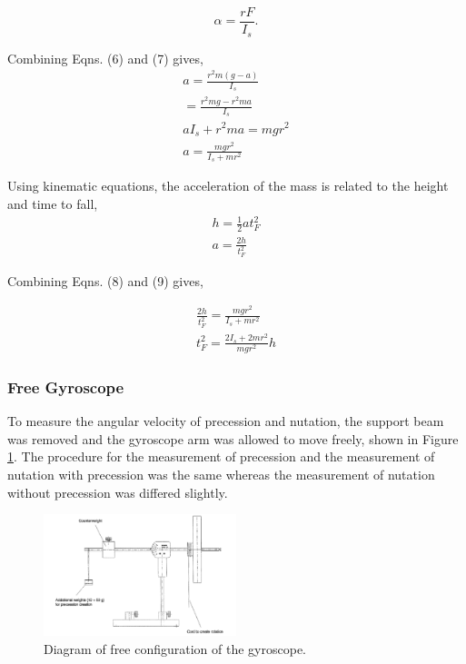 \documentclass{article}
\begin{document}
\begin{equation}
    \alpha = \frac{rF}{I_s}.
\end{equation}

Combining Eqns. (6) and (7) gives,
\begin{equation}
    \begin{split}
    a = \frac{r^2m(g-a)}{I_s} \\
    = \frac{r^2mg-r^2ma}{I_s} \\
    aI_s+r^2ma = mgr^2 \\
    a = \frac{mgr^2}{I_s+mr^2}  
    \end{split}
\end{equation}

Using kinematic equations, the acceleration of the mass is related 
to the height and time to fall,
\begin{equation}
    \begin{split}
        h  = \frac{1}{2}at^2_F \\
        a = \frac{2h}{t^2_F} 
    \end{split}
\end{equation}

Combining Eqns. (8) and (9) gives,

\begin{equation}
    \begin{split}
        \frac{2h}{t^2_F} = \frac{mgr^2}{I_s+mr^2} \\
        t^2_F = \frac{2I_s+2mr^2}{mgr^2}h    
    \end{split}
\end{equation}

\subsubsection{Free Gyroscope}
To measure the angular velocity of precession and nutation, the support beam 
was removed and the gyroscope arm was allowed to move freely, shown in Figure \ref{fig:free}. 
The procedure for the measurement of precession and the measurement of nutation with 
precession was the same whereas the measurement of nutation without precession was differed
slightly.

\begin{figure}[H]
    \centering
    \includegraphics[width=0.5\textwidth]{figure2.png}
    \caption{Diagram of free configuration of the gyroscope.}
    \label{fig:free}
\end{figure}
\end{document}
